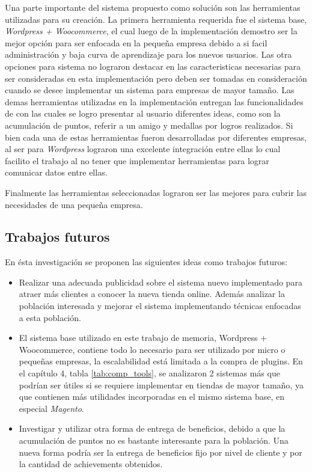 Una parte importante del sistema propuesto como solución son las herramientas utilizadas para su creación. 
La primera herramienta requerida fue el sistema base, \emph{Wordpress + Woocommerce}, el cual luego de 
la implementación demostro ser la mejor opción para ser enfocada en la pequeña empresa debido a si 
facil administración y baja curva de aprendizaje para los nuevos usuarios. Las otra opciones para sistema no lograron
destacar en las caracteristicas necesarias para ser consideradas en esta implementación pero deben ser
tomadas en consideración cuando se desee implementar un sistema para empresas de mayor tamaño.
Las demas herramientas utilizadas en la implementación entregan las funcionalidades de {\gam} con las cuales
se logro presentar al usuario diferentes ideas, como son la acumulación de puntos, referir a un amigo y medallas
por logros realizados. Si bien cada una de estas herramientas fueron desarrolladas por diferentes empresas,
al ser para \emph{Wordpress} lograron una excelente integración entre ellas lo cual facilito el trabajo 
al no tener que implementar herramientas para lograr comunicar datos entre ellas.

Finalmente las herramientas seleccionadas lograron ser las mejores para cubrir las necesidades de 
una pequeña empresa. 

\subsection{Trabajos futuros}

En ésta investigación se proponen las siguientes ideas como trabajos futuros:


\begin{itemize}

\item Realizar una adecuada publicidad sobre el sistema nuevo implementado para
	atraer más clientes a conocer la nueva tienda online. Además analizar
	la población interesada y mejorar el sistema implementando técnicas 
	enfocadas a esta población.

\item El sistema base utilizado en este trabajo de memoria, Wordpress $+$ Woocommerce, contiene
todo lo necesario para ser utilizado por micro o pequeñas empresas, la escalabilidad está limitada
a la compra de plugins. En el capítulo 4, tabla \ref{tab:comp_tools}, se analizaron 2 sistemas más
que podrían ser útiles si se requiere implementar {\GAM} en tiendas de mayor tamaño, ya que contienen
más utilidades incorporadas en el mismo sistema base, en especial \emph{Magento}.

\item Investigar y utilizar otra forma de entrega de beneficios, debido a que la 
acumulación de puntos no es bastante interesante para la población. Una nueva forma podría ser la entrega 
de beneficios fijo por nivel de cliente y por la cantidad de achievements obtenidos.

\end{itemize}


